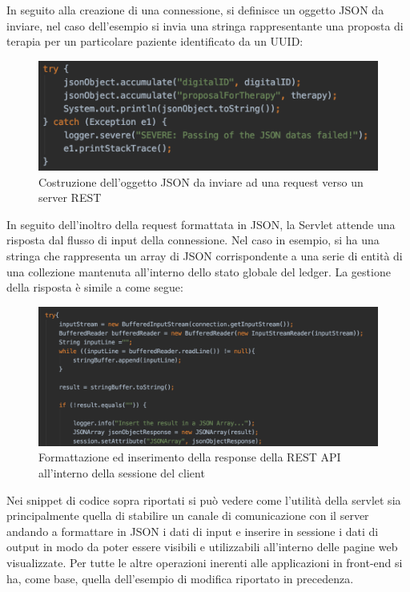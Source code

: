 \newpage
In seguito alla creazione di una connessione, si definisce un oggetto JSON da inviare, nel caso dell'esempio si invia una stringa rappresentante una proposta di terapia per un particolare paziente identificato da un UUID:
\begin{figure}[h]
    \centering
    \includegraphics[width=1\textwidth]{img/json_object.png}
    \caption{Costruzione dell'oggetto JSON da inviare ad una request verso un server REST}
    \label{fig:json_request}
\end{figure}
In seguito dell'inoltro della request formattata in JSON, la Servlet attende una risposta dal flusso di input della connessione. Nel caso in esempio, si ha una stringa che rappresenta un array di JSON corrispondente a una serie di entità di una collezione mantenuta all'interno dello stato globale del ledger. La gestione della risposta è simile a come segue:
\begin{figure}[h]
    \centering
    \includegraphics[width=1\textwidth]{img/response_string.png}
    \caption{Formattazione ed inserimento della response della REST API all'interno della sessione del client}
    \label{fig:json_response}
\end{figure}
Nei snippet di codice sopra riportati si può vedere come l'utilità della servlet sia principalmente quella di stabilire un canale di comunicazione con il server andando a formattare in JSON i dati di input e inserire in sessione i dati di output in modo da poter essere visibili e utilizzabili all'interno delle pagine web visualizzate. Per tutte le altre operazioni inerenti alle applicazioni in front-end si ha, come base, quella dell'esempio di modifica riportato in precedenza. 
